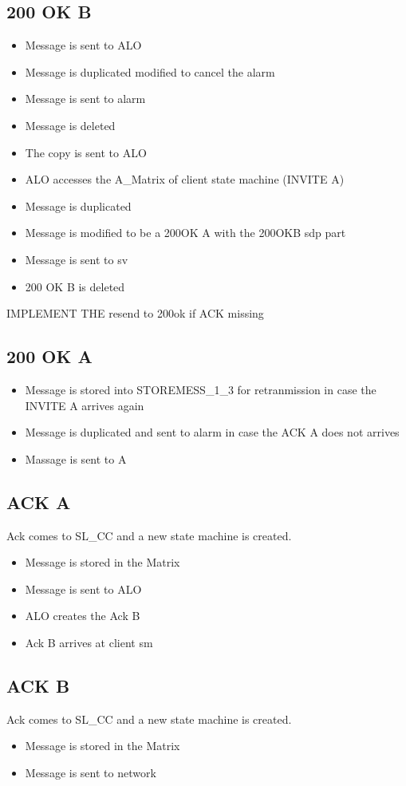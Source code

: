 \documentclass[a4paper]{report}
\begin{document}
\subsection{200 OK B}
\begin {itemize}
\item Message is sent to ALO
\item Message is duplicated modified to cancel the alarm
\item Message is sent to alarm
\item Message is deleted
\item The copy is sent to ALO
\item ALO accesses the A\_Matrix of client state machine (INVITE A)
\item Message is duplicated
\item Message is modified to be a 200OK A with the 200OKB sdp part
\item Message is sent to sv
\item 200 OK B is deleted
\end{itemize}

IMPLEMENT THE resend to 200ok if ACK missing

\subsection{200 OK A}
\begin {itemize}
\item Message is stored into STOREMESS\_1\_3 for retranmission in case the INVITE A arrives again
\item Message is duplicated and sent to alarm in case the ACK A does not arrives
\item Massage is sent to A
\end{itemize}

\subsection{ACK A}
Ack comes to SL\_CC and a new state machine is created.
\begin {itemize}
\item Message is stored in the Matrix 
\item Message is sent to ALO
\item ALO creates the Ack B
\item Ack B arrives at client sm
\end{itemize}

\subsection{ACK B}
Ack comes to SL\_CC and a new state machine is created.
\begin {itemize}
\item Message is stored in the Matrix 
\item Message is sent to network
\end{itemize}
\end{document}
